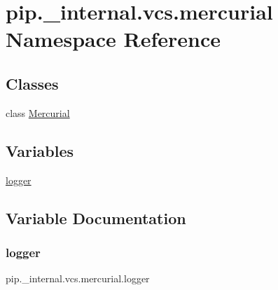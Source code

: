 \hypertarget{namespacepip_1_1__internal_1_1vcs_1_1mercurial}{}\section{pip.\+\_\+internal.\+vcs.\+mercurial Namespace Reference}
\label{namespacepip_1_1__internal_1_1vcs_1_1mercurial}
\subsection*{Classes}
\begin{DoxyCompactItemize}
\item 
class \hyperlink{classpip_1_1__internal_1_1vcs_1_1mercurial_1_1Mercurial}{Mercurial}
\end{DoxyCompactItemize}
\subsection*{Variables}
\begin{DoxyCompactItemize}
\item 
\hyperlink{namespacepip_1_1__internal_1_1vcs_1_1mercurial_aef6b462043c83dbb60f2cb262adbc1e6}{logger}
\end{DoxyCompactItemize}


\subsection{Variable Documentation}
\mbox{\label{namespacepip_1_1__internal_1_1vcs_1_1mercurial_aef6b462043c83dbb60f2cb262adbc1e6}} 
\subsubsection{\texorpdfstring{logger}{logger}}
{\footnotesize\ttfamily pip.\+\_\+internal.\+vcs.\+mercurial.\+logger}

